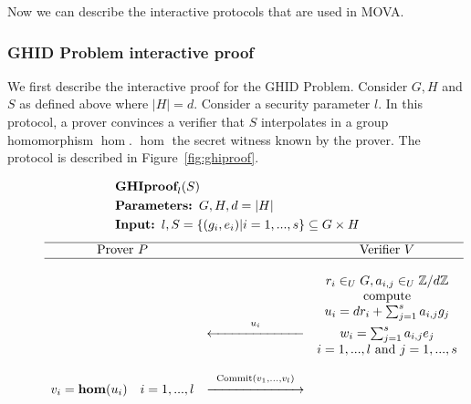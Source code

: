 Now we can describe the interactive protocols that are used in MOVA. 

\subsubsection{GHID Problem interactive proof}

We first describe the interactive proof for the GHID Problem.
Consider $G,H$ and $S$ as defined above where $|H| = d$. 
Consider a security parameter $l$. In this protocol, a prover convinces a verifier that $S$ interpolates in a group homomorphism $\hom$.
$\hom$ the secret witness known by the prover. 
The protocol is described in Figure~\ref{fig:ghiproof}.


\begin{figure}[!h]
    \centering
    \[
        \begin{split}
        &\mbox{\bf GHIproof}_l(S)\\
        &\mbox{\bf Parameters: } G,H,d=|H|\\
        &\mbox{\bf Input: } l,S = \{(g_i,e_i)|i=1,...,s\} \subseteq G\times H\\
        \end{split}
    \]
    \[
        \begin{array}{ccc}
        \hline
            \mbox{Prover } P                      &                  & \mbox{Verifier } V                                  \\
        \hline
                                                  &                  &                                                     \\
                                                  &                  & r_i \in_U G, a_{i,j} \in_U \mathbb{Z}/d\mathbb{Z}  \\ 
                                                  &                  & \mbox{compute}                                      \\
                                                  &                  & u_i = dr_i + \sum_{j=1}^{s}{a_{i,j}g_{j}}           \\
                                                  & \overset{u_i}{\xleftarrow{\hspace*{70pt}}} & w_i = \sum_{j=1}^{s}{a_{i,j}e_{j}}           \\
                                                  &                  & i = 1,...,l \mbox{ and } j=1,...,s      \\
                                                  &&\\
            v_i = \mathbf{hom}(u_i) \quad i=1,...,l & \overset{\mathrm{Commit}(v_1,...,v_l)}{\xrightarrow{\hspace*{70pt}}} &                                   \\

\end{array}\]
\end{figure}
